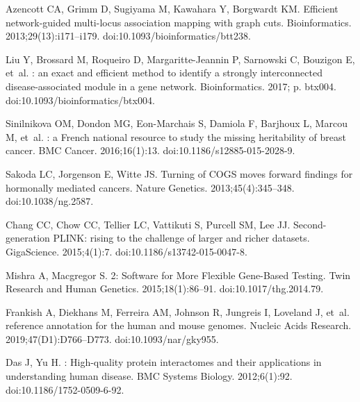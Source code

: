 \documentclass[10pt,letterpaper]{article}
\begin{document}
\begin{thebibliography}{10}
  Azencott CA, Grimm D, Sugiyama M, Kawahara Y, Borgwardt KM.
  \newblock Efficient network-guided multi-locus association mapping with graph
    cuts.
  \newblock Bioinformatics. 2013;29(13):i171--i179.
  \newblock doi:{10.1093/bioinformatics/btt238}.
  
  Liu Y, Brossard M, Roqueiro D, Margaritte-Jeannin P, Sarnowski C, Bouzigon E,
    et~al.
  : an exact and efficient method to identify a strongly
    interconnected disease-associated module in a gene network.
  \newblock Bioinformatics. 2017; p. btx004.
  \newblock doi:{10.1093/bioinformatics/btx004}.
  
  Sinilnikova OM, Dondon MG, Eon-Marchais S, Damiola F, Barjhoux L, Marcou M,
    et~al.
  : a {French} national resource to study the missing
    heritability of breast cancer.
  \newblock BMC Cancer. 2016;16(1):13.
  \newblock doi:{10.1186/s12885-015-2028-9}.
  
  Sakoda LC, Jorgenson E, Witte JS.
  \newblock Turning of {COGS} moves forward findings for hormonally mediated
    cancers.
  \newblock Nature Genetics. 2013;45(4):345--348.
  \newblock doi:{10.1038/ng.2587}.
  
  Chang CC, Chow CC, Tellier LC, Vattikuti S, Purcell SM, Lee JJ.
  \newblock Second-generation {PLINK}: rising to the challenge of larger and
    richer datasets.
  \newblock GigaScience. 2015;4(1):7.
  \newblock doi:{10.1186/s13742-015-0047-8}.
  
  Mishra A, Macgregor S.
  2: {Software} for {More} {Flexible} {Gene}-{Based} {Testing}.
  \newblock Twin Research and Human Genetics. 2015;18(1):86--91.
  \newblock doi:{10.1017/thg.2014.79}.
  
  Frankish A, Diekhans M, Ferreira AM, Johnson R, Jungreis I, Loveland J, et~al.
   reference annotation for the human and mouse genomes.
  \newblock Nucleic Acids Research. 2019;47(D1):D766--D773.
  \newblock doi:{10.1093/nar/gky955}.
  
  Das J, Yu H.
  : {High}-quality protein interactomes and their applications in
    understanding human disease.
  \newblock BMC Systems Biology. 2012;6(1):92.
  \newblock doi:{10.1186/1752-0509-6-92}.
  

\end{thebibliography}
\end{document}
